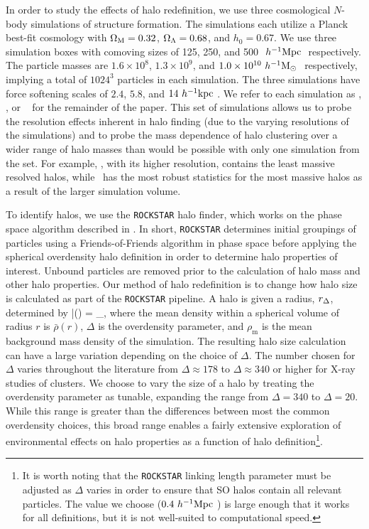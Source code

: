 \documentclass[usenatbib,fleqn]{mnras}
\begin{document}
In order to study the effects of halo redefinition, we use three cosmological $N$-body simulations of structure
formation. The \citet{diemer_kravtsov15} simulations each utilize a Planck best-fit cosmology with $\Omega_{\mathrm{M}} = 0.32$, $\Omega_{\Lambda} =
0.68$, and $h_0 = 0.67$. We use three simulation boxes with comoving sizes of 125, 250, and 500
$\ h^{-1}\mathrm{Mpc}~$ respectively. The particle masses are $1.6 \times 10^8$, $1.3 \times 10^9$, and $1.0 \times 10^{10}
\ h^{-1}\mathrm{M}_{\odot}~$ respectively, implying a total of $1024^3$ particles in each simulation. The three
simulations have force softening scales of $2.4$, $5.8$, and $14 \ h^{-1}\mathrm{kpc}~$. We refer to each simulation as
\simA, \simB, or \simC~  for the remainder of the paper. This set of simulations allows us to probe the
resolution effects inherent in halo finding (due to the varying resolutions of the simulations) and to probe the
mass dependence of halo clustering over a wider range of halo masses than would be possible with only one
simulation from the set. For example, \simA, with its higher resolution, contains the least massive resolved
halos, while \simC~has the most robust statistics for the most massive halos as a result of the larger simulation
volume.


To identify halos, we use the {\tt ROCKSTAR} halo finder, which works on the phase space algorithm described in
\citet*{behroozi_etal13a}. In short, {\tt ROCKSTAR} determines initial groupings of particles using a Friends-of-Friends algorithm 
in phase space before applying the spherical overdensity halo definition in order to determine halo properties of
interest. Unbound particles are removed prior to the calculation of halo mass and other halo properties. Our
method of halo redefinition is to change how halo size is calculated as part of the {\tt ROCKSTAR} pipeline. 
A halo is given a radius, $r_{\Delta}$, determined by
\beq
	\bar{\rho}(\Rdel) = \Delta \rho_{}, 
\eeq
where the mean density within a spherical volume of radius $r$ is $\bar{\rho}(r)$, $\Delta$ is the overdensity
parameter, and $\rho_{\mathrm{m}}$ is the mean background mass density of the simulation. The resulting
halo size calculation can have a large variation depending on the choice of $\Delta$. The number chosen for
$\Delta$ varies throughout the literature from $\Delta \approx 178$ to $\Delta \approx 340$ or higher for X-ray studies of 
clusters. We choose to vary the size of a halo by treating the overdensity parameter as tunable, expanding the range from 
$\Delta = 340$ to $\Delta = 20$. While this range is greater than the differences between most 
the common overdensity choices, this broad range enables a fairly extensive exploration of 
environmental effects on halo properties as a function of halo definition\footnote{It is worth noting that the 
{\tt ROCKSTAR} linking length parameter must be adjusted as $\Delta$ varies in order to ensure 
that SO halos contain all relevant particles. The value we choose ($0.4 \ h^{-1}\mathrm{Mpc}~$) is large enough that it works for all definitions, but it is not well-suited to computational speed.}.
\end{document}
